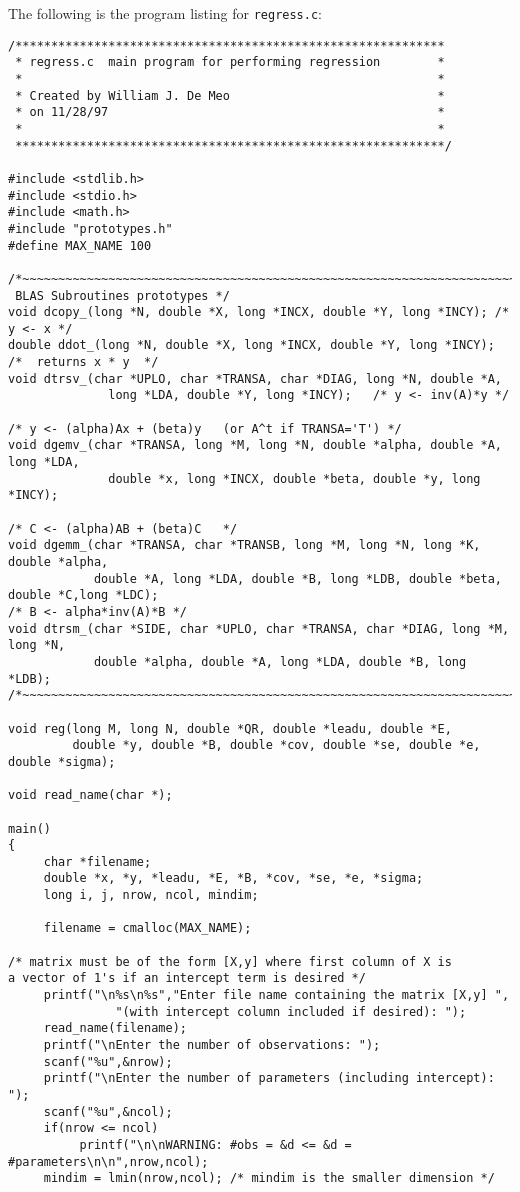 \documentclass{article}
\begin{document}
The following is the program listing for {\tt regress.c}:
\begin{verbatim}
/************************************************************
 * regress.c  main program for performing regression        *
 *                                                          *
 * Created by William J. De Meo                             *
 * on 11/28/97                                              *
 *                                                          *
 ************************************************************/

#include <stdlib.h>
#include <stdio.h>
#include <math.h>
#include "prototypes.h"
#define MAX_NAME 100

/*~~~~~~~~~~~~~~~~~~~~~~~~~~~~~~~~~~~~~~~~~~~~~~~~~~~~~~~~~~~~~~~~~~~~~~
 BLAS Subroutines prototypes */
void dcopy_(long *N, double *X, long *INCX, double *Y, long *INCY); /* y <- x */
double ddot_(long *N, double *X, long *INCX, double *Y, long *INCY); /*  returns x * y  */
void dtrsv_(char *UPLO, char *TRANSA, char *DIAG, long *N, double *A, 
              long *LDA, double *Y, long *INCY);   /* y <- inv(A)*y */

/* y <- (alpha)Ax + (beta)y   (or A^t if TRANSA='T') */
void dgemv_(char *TRANSA, long *M, long *N, double *alpha, double *A, long *LDA, 
              double *x, long *INCX, double *beta, double *y, long *INCY);

/* C <- (alpha)AB + (beta)C   */
void dgemm_(char *TRANSA, char *TRANSB, long *M, long *N, long *K, double *alpha, 
            double *A, long *LDA, double *B, long *LDB, double *beta, double *C,long *LDC); 
/* B <- alpha*inv(A)*B */
void dtrsm_(char *SIDE, char *UPLO, char *TRANSA, char *DIAG, long *M, long *N,
            double *alpha, double *A, long *LDA, double *B, long *LDB);
/*~~~~~~~~~~~~~~~~~~~~~~~~~~~~~~~~~~~~~~~~~~~~~~~~~~~~~~~~~~~~~~~~~~~~~~*/

void reg(long M, long N, double *QR, double *leadu, double *E, 
         double *y, double *B, double *cov, double *se, double *e, double *sigma);

void read_name(char *);

main()
{
     char *filename;
     double *x, *y, *leadu, *E, *B, *cov, *se, *e, *sigma;
     long i, j, nrow, ncol, mindim;
  
     filename = cmalloc(MAX_NAME);

/* matrix must be of the form [X,y] where first column of X is 
a vector of 1's if an intercept term is desired */
     printf("\n%s\n%s","Enter file name containing the matrix [X,y] ",
               "(with intercept column included if desired): ");
     read_name(filename);
     printf("\nEnter the number of observations: ");
     scanf("%u",&nrow);
     printf("\nEnter the number of parameters (including intercept): ");
     scanf("%u",&ncol);
     if(nrow <= ncol) 
          printf("\n\nWARNING: #obs = &d <= &d = #parameters\n\n",nrow,ncol);
     mindim = lmin(nrow,ncol); /* mindim is the smaller dimension */


\end{verbatim}
\end{document}
